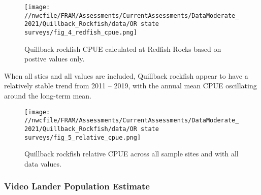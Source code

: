 \documentclass[11pt,
  english,
  a4paper,
]{article}
\begin{document}
\leavevmode\tagmcend\tagstructend\par


\begin{figure}
\centering
\texttt{[image: //nwcfile/FRAM/Assessments/CurrentAssessments/DataModerate\_2021/Quillback\_Rockfish/data/OR state surveys/fig\_4\_redfish\_cpue.png]}
\caption{Quillback rockfish CPUE calculated at Redfish Rocks based on postive values only.\label{fig:fig-4}}
\end{figure}

\tagmcend\tagstructend


When all sties and all values are included, Quillback rockfish appear to have a relatively stable trend from 2011 -- 2019, with the annual mean CPUE oscillating around the long-term mean.

\leavevmode\tagmcend\tagstructend\par


\begin{figure}
\centering
\texttt{[image: //nwcfile/FRAM/Assessments/CurrentAssessments/DataModerate\_2021/Quillback\_Rockfish/data/OR state surveys/fig\_5\_relative\_cpue.png]}
\caption{Quillback rockfish relative CPUE across all sample sites and with all data values.\label{fig:fig-5}}
\end{figure}

\tagmcend\tagstructend


\hypertarget{video-lander-population-estimate}{%
\subsubsection{Video Lander Population Estimate}\label{video-lander-population-estimate}}

\leavevmode\tagmcend\tagstructend

\end{document}
